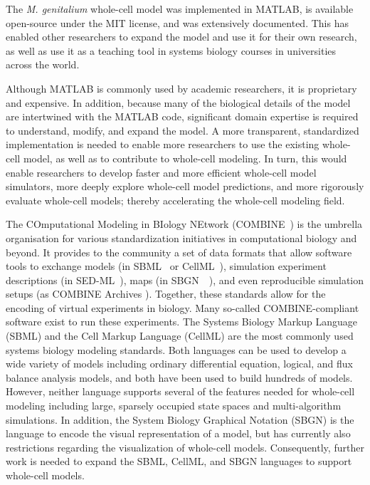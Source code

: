 \documentclass[journal,transmag]{IEEEtran}
\begin{document}
The \textit{M. genitalium} whole-cell model was implemented in MATLAB, is available open-source under the MIT license, and was extensively documented. 
This has enabled other researchers to expand the model and use it for their own research, as well as use it as a teaching tool in systems biology courses in universities across the world. 

Although MATLAB is commonly used by academic researchers, it is proprietary and expensive. In addition, because many of the biological details of the model are intertwined with the MATLAB code, significant domain expertise is required to understand, modify, and expand the model. 
A more transparent, standardized implementation is needed to enable more researchers to use the existing whole-cell model, as well as to contribute to whole-cell modeling. 
In turn, this would enable researchers to develop faster and more efficient whole-cell model simulators, more deeply explore whole-cell model predictions, and more rigorously evaluate whole-cell models; thereby accelerating the whole-cell modeling field.

The COmputational Modeling in BIology NEtwork (COMBINE~\cite{LeNovere2011}) is the umbrella organisation for various standardization initiatives in computational biology and beyond.
It provides  to the community a set of data formats that allow software tools to exchange models (in SBML~\cite{hucka2003} or CellML~\cite{hedley_2001b}), simulation experiment descriptions (in SED-ML~\cite{sedml2011}), maps (in SBGN~~\cite{LeNovereHMMSS09}), and even reproducible simulation setups (as COMBINE Archives \cite{Bergmann2014combine}).  
Together, these standards allow for the encoding of virtual experiments in biology. 
Many so-called COMBINE-compliant software exist to run these experiments. 
The Systems Biology Markup Language (SBML) and the Cell Markup Language (CellML) are the most commonly used systems biology modeling standards. 
Both languages can be used to develop a wide variety of models including ordinary differential equation, logical, and flux balance analysis models, and both have been used to build hundreds of models. 
However, neither language supports several of the features needed for whole-cell modeling including large, sparsely occupied state spaces and multi-algorithm simulations. 
In addition, the System Biology Graphical Notation (SBGN) is the language to encode the visual representation of a model, but has currently also restrictions regarding the visualization of whole-cell models. 
Consequently, further work is needed to expand the SBML, CellML, and SBGN languages to support whole-cell models.
\end{document}
